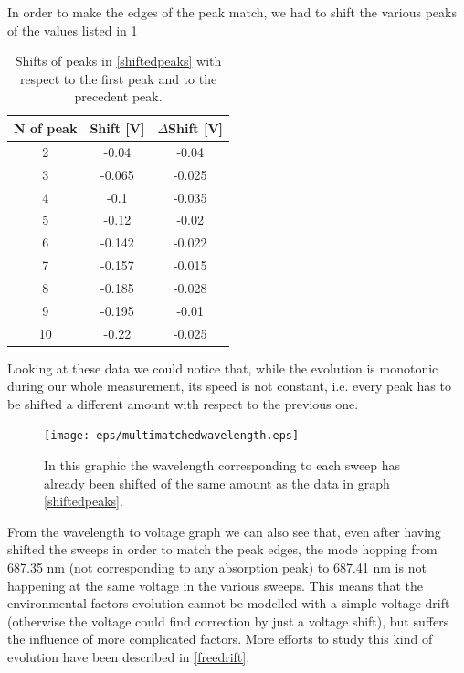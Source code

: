 In order to make the edges of the peak match, we had to shift the various peaks of the values listed in \cref{peakshifts}
\begin{table}[!htbp]\centering
\begin{tabular}{|c|c|c|}
\hline
N of peak & Shift [V] & $\Delta$Shift [V] \\ \hline
2 & -0.04 & -0.04 \\ \hline
3 & -0.065 & -0.025 \\ \hline
4 & -0.1 & -0.035 \\ \hline
5 & -0.12 & -0.02 \\ \hline
6 & -0.142 & -0.022 \\ \hline
7 & -0.157 & -0.015 \\ \hline
8 & -0.185 & -0.028 \\ \hline
9 & -0.195 & -0.01 \\ \hline
10 & -0.22 & -0.025 \\ \hline
\end{tabular}
\caption{Shifts of peaks in \cref{shiftedpeaks} with respect to the first peak and to the precedent peak.}
\label{peakshifts}
\end{table}

Looking at these data we could notice that, while the evolution is monotonic during our whole measurement, its speed is not constant, i.e. every peak has to be shifted a different amount with respect to the previous one.

\begin{figure}[!tphb]\centering
\texttt{[image: eps/multimatchedwavelength.eps]}
\caption{In this graphic the wavelength corresponding to each sweep has already been shifted of the same amount as the data in graph \cref{shiftedpeaks}.}
\label{multiwave}
\end{figure}

From the wavelength to voltage graph we can also see that, even after having shifted the sweeps in order to match the peak edges, the mode hopping from 687.35 nm (not corresponding to any absorption peak) to 687.41 nm is not happening at the same voltage in the various sweeps. This means that the environmental factors evolution cannot be modelled with a simple voltage drift (otherwise the voltage could find correction by just a voltage shift), but suffers the influence of more complicated factors.
More efforts to study this kind of evolution have been described in \cref{freedrift}.


